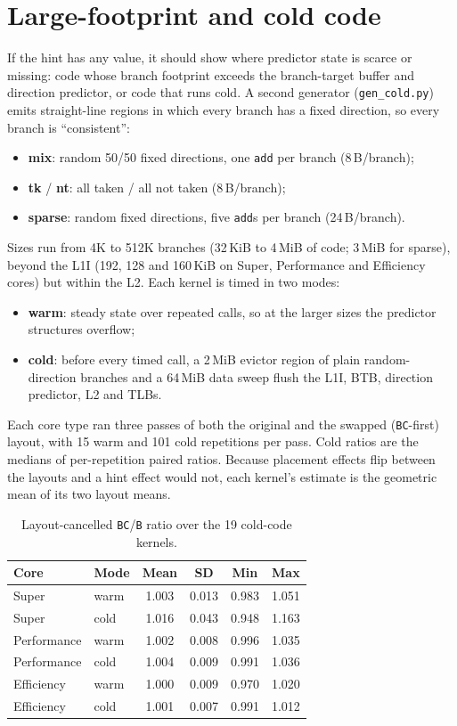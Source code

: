 \documentclass[10pt]{article}
\begin{document}
\section{Large-footprint and cold code}
If the hint has any value, it should show where predictor state is scarce or missing: code
whose branch footprint exceeds the branch-target buffer and direction predictor, or code
that runs cold. A second generator (\texttt{gen\_cold.py}) emits straight-line regions in
which every branch has a fixed direction, so every branch is ``consistent'':
\begin{itemize}
  \item \textbf{mix}: random 50/50 fixed directions, one \texttt{add} per branch (8\,B/branch);
  \item \textbf{tk} / \textbf{nt}: all taken / all not taken (8\,B/branch);
  \item \textbf{sparse}: random fixed directions, five \texttt{add}s per branch (24\,B/branch).
\end{itemize}
Sizes run from 4K to 512K branches (32\,KiB to 4\,MiB of code; 3\,MiB for sparse), beyond
the L1I (192, 128 and 160\,KiB on Super, Performance and Efficiency cores) but within the
L2. Each kernel is timed in two modes:
\begin{itemize}
  \item \textbf{warm}: steady state over repeated calls, so at the larger sizes the
        predictor structures overflow;
  \item \textbf{cold}: before every timed call, a 2\,MiB evictor region of plain random-direction
        branches and a 64\,MiB data sweep flush the L1I, BTB, direction predictor, L2 and TLBs.
\end{itemize}
Each core type ran three passes of both the original and the swapped (\texttt{BC}-first) layout,
with 15 warm and 101 cold repetitions per pass. Cold ratios are the medians of per-repetition
paired ratios. Because placement effects flip between the layouts and a hint effect would not,
each kernel's estimate is the geometric mean of its two layout means.

\begin{table}[h]
\centering
\caption{Layout-cancelled \texttt{BC}/\texttt{B} ratio over the 19 cold-code kernels.}
\label{tab:cold}
\begin{tabular}{llcccc}
\toprule
Core & Mode & Mean & SD & Min & Max \\
\midrule
Super       & warm & 1.003 & 0.013 & 0.983 & 1.051 \\
Super       & cold & 1.016 & 0.043 & 0.948 & 1.163 \\
Performance & warm & 1.002 & 0.008 & 0.996 & 1.035 \\
Performance & cold & 1.004 & 0.009 & 0.991 & 1.036 \\
Efficiency  & warm & 1.000 & 0.009 & 0.970 & 1.020 \\
Efficiency  & cold & 1.001 & 0.007 & 0.991 & 1.012 \\
\bottomrule
\end{tabular}
\end{table}
\end{document}

